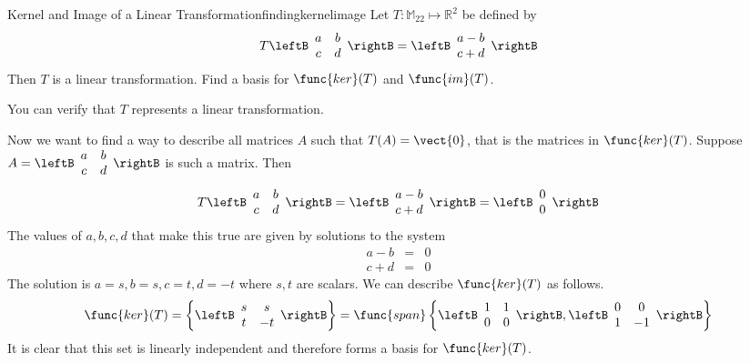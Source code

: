 \begin{example}{Kernel and Image of a Linear Transformation}{findingkernelimage}
Let $T: \mathbb{M}_{22} \mapsto \mathbb{R}^2$ be defined by
\[
T \leftB \begin{array}{cc}
a & b \\
c & d 
\end{array}
\rightB
 = 
\leftB
\begin{array}{c}
a - b \\
c + d
\end{array}
\rightB
\]
Then $T$ is a linear transformation. Find a basis for $\func{ker} (T)$ and $\func{im}(T)$.
\end{example}

\begin{solution}
You can verify that $T$ represents a linear transformation. 

Now we want to find a way to describe all matrices $A$ such that $T(A) = \vect{0}$, that is the matrices in $\func{ker}(T)$. 
Suppose $A = \leftB \begin{array}{cc}
a & b \\
c & d 
\end{array}
\rightB$ is such a matrix. 
Then
\[
T \leftB \begin{array}{cc}
a & b \\
c & d 
\end{array}
\rightB
 = 
\leftB
\begin{array}{c}
a - b \\
c + d
\end{array}
\rightB
 = 
\leftB
\begin{array}{c}
0 \\
0
\end{array}
\rightB
\]
The values of $a, b, c, d$ that make this true are given by solutions to the system
\begin{eqnarray*}
a - b &=& 0 \\
c + d &=& 0 
\end{eqnarray*}
The solution is $a = s, b = s, c = t, d = -t$ where $s, t$ are scalars. We can describe $\func{ker}(T)$ as follows.
\[
\func{ker}(T) = 
\left\{ 
\leftB \begin{array}{cc}
s & s \\
t & -t 
\end{array}
\rightB
\right\}
=
\func{span}
\left\{
\leftB \begin{array}{cc}
1 & 1 \\
0 & 0 
\end{array} \rightB, 
\leftB \begin{array}{cc}
0 & 0 \\
1 & -1 
\end{array} \rightB
\right\}
\]
It is clear that this set is linearly independent and therefore forms a basis for $\func{ker}(T)$. 


\end{solution}
